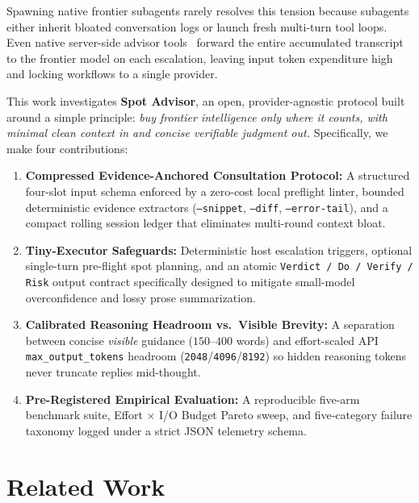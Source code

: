 \documentclass[11pt]{article}
\begin{document}
Spawning native frontier subagents rarely resolves this tension because subagents either inherit bloated conversation logs or launch fresh multi-turn tool loops. Even native server-side advisor tools~\citep{anthropic2026advisor} forward the entire accumulated transcript to the frontier model on each escalation, leaving input token expenditure high and locking workflows to a single provider.

This work investigates \textbf{Spot Advisor}, an open, provider-agnostic protocol built around a simple principle: \emph{buy frontier intelligence only where it counts, with minimal clean context in and concise verifiable judgment out.} Specifically, we make four contributions:
\begin{enumerate}
    \item \textbf{Compressed Evidence-Anchored Consultation Protocol:} A structured four-slot input schema enforced by a zero-cost local preflight linter, bounded deterministic evidence extractors (\texttt{--snippet}, \texttt{--diff}, \texttt{--error-tail}), and a compact rolling session ledger that eliminates multi-round context bloat.
    \item \textbf{Tiny-Executor Safeguards:} Deterministic host escalation triggers, optional single-turn pre-flight spot planning, and an atomic \texttt{Verdict / Do / Verify / Risk} output contract specifically designed to mitigate small-model overconfidence and lossy prose summarization.
    \item \textbf{Calibrated Reasoning Headroom vs.\ Visible Brevity:} A separation between concise \emph{visible} guidance ($150\text{--}400$ words) and effort-scaled API \texttt{max\_output\_tokens} headroom (\texttt{2048}/\texttt{4096}/\texttt{8192}) so hidden reasoning tokens never truncate replies mid-thought.
    \item \textbf{Pre-Registered Empirical Evaluation:} A reproducible five-arm benchmark suite, Effort $\times$ I/O Budget Pareto sweep, and five-category failure taxonomy logged under a strict JSON telemetry schema.
\end{enumerate}

\section{Related Work}
\label{sec:related}
\end{document}
